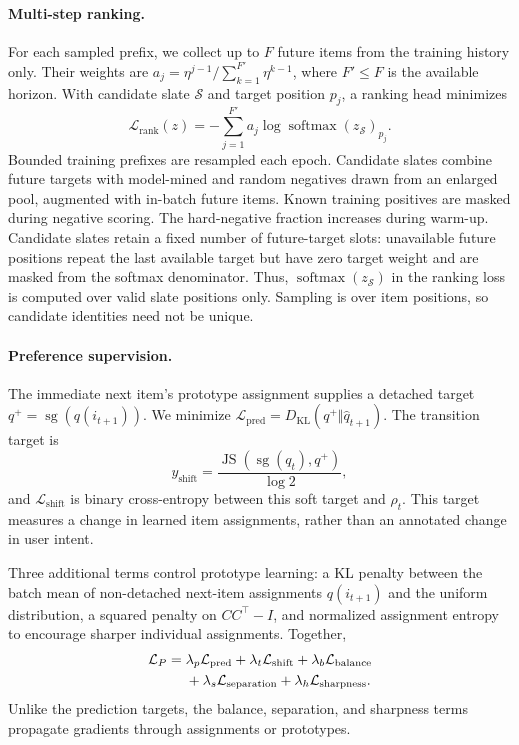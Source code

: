 \documentclass[11pt]{article}
\newcommand{\softmax}{\operatorname{softmax}}
\newcommand{\sg}{\operatorname{sg}}
\begin{document}
\paragraph{Multi-step ranking.}
For each sampled prefix, we collect up to $F$ future items from the training history only. Their weights are $a_j=\eta^{j-1}/\sum_{k=1}^{F'}\eta^{k-1}$, where $F'\leq F$ is the available horizon. With candidate slate $\mathcal S$ and target position $p_j$, a ranking head minimizes
\begin{equation}
 \mathcal L_{\mathrm{rank}}(z)
 =-\sum_{j=1}^{F'}a_j\log\softmax(z_{\mathcal S})_{p_j}.
\end{equation}
Bounded training prefixes are resampled each epoch. Candidate slates combine future targets with model-mined and random negatives drawn from an enlarged pool, augmented with in-batch future items. Known training positives are masked during negative scoring. The hard-negative fraction increases during warm-up. Candidate slates retain a fixed number of future-target slots: unavailable future positions repeat the last available target but have zero target weight and are masked from the softmax denominator. Thus, $\softmax(z_{\mathcal S})$ in the ranking loss is computed over valid slate positions only. Sampling is over item positions, so candidate identities need not be unique.

\paragraph{Preference supervision.}
The immediate next item's prototype assignment supplies a detached target $q^+=\sg(q(i_{t+1}))$. We minimize $\mathcal L_{\mathrm{pred}}=D_{\mathrm{KL}}(q^+\Vert\widehat q_{t+1})$. The transition target is
\begin{equation}
 y_{\mathrm{shift}}=\frac{\operatorname{JS}(\sg(q_t),q^+)}{\log 2},
\end{equation}
and $\mathcal L_{\mathrm{shift}}$ is binary cross-entropy between this soft target and $\rho_t$. This target measures a change in learned item assignments, rather than an annotated change in user intent.

Three additional terms control prototype learning: a KL penalty between the batch mean of non-detached next-item assignments $q(i_{t+1})$ and the uniform distribution, a squared penalty on $CC^\top-I$, and normalized assignment entropy to encourage sharper individual assignments. Together,
\begin{align}
 \mathcal L_P={}&\lambda_p\mathcal L_{\mathrm{pred}}
 +\lambda_t\mathcal L_{\mathrm{shift}}
 +\lambda_b\mathcal L_{\mathrm{balance}}\nonumber\notag\\
 &+\lambda_s\mathcal L_{\mathrm{separation}}
 +\lambda_h\mathcal L_{\mathrm{sharpness}}.
\end{align}
Unlike the prediction targets, the balance, separation, and sharpness terms propagate gradients through assignments or prototypes.
\end{document}
